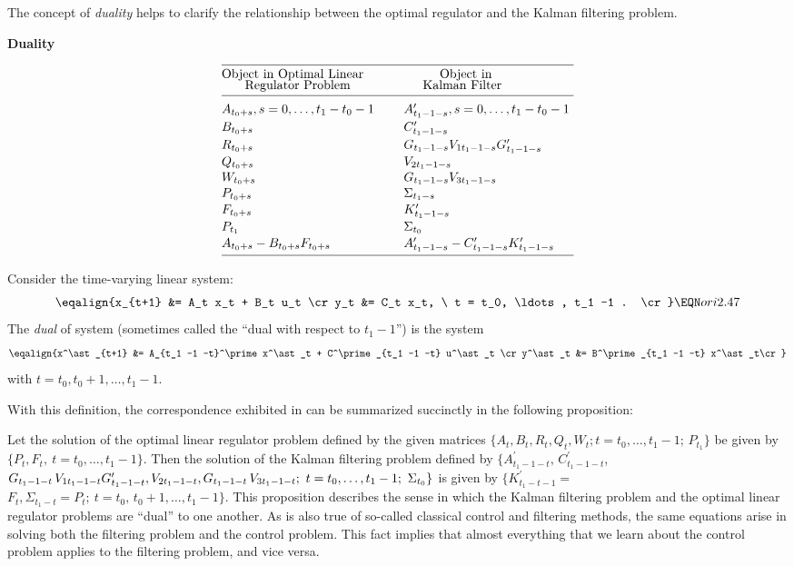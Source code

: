 The concept of {\it duality\/} helps to clarify the relationship between
the optimal regulator and the Kalman filtering problem.
\medskip
{}
\caption{\bf Duality}
$$\vbox{\offinterlineskip \hrule
\halign{#\hfil & \qquad #\hfil \cr
\noalign{\smallskip}
Object in Optimal Linear & \phantom{00000} Object in \cr
\phantom{000} Regulator Problem & \phantom{000}Kalman Filter \cr
\noalign{\smallskip}
    \noalign{\hrule}
\noalign{\medskip}
$A_{t_0 + s}, s = 0,\ldots, t_1 - t_0 -1$ & $A_{t_1 - 1 -s}^\prime,
s=0, \ldots, t_1 -t_0 -1$ \cr
\noalign{\smallskip}
$B_{t_0 + s}$ & $C_{t_1 -1 -s}^\prime$ \cr
\noalign{\smallskip}
$R_{t_0+s}$ & $G_{t_1 -1 -s} V_{1 t_1 -1 -s} G_{t_1 -1 -s}^\prime$ \cr
\noalign{\smallskip}
$Q_{t_0 + s}$ & $V_{2t_1 -1 -s}$ \cr
\noalign{\smallskip}
$W_{t_0 + s}$ & $G_{t_1 -1 -s} V_{3 t_1 -1 -s}$\cr
\noalign{\smallskip}
$P_{t_0 + s}$ & $\Sigma_{t_1 - s}$\cr
\noalign{\smallskip}
$F_{t_0 + s}$ & $K_{t_1 -1 -s}^\prime$ \cr
\noalign{\smallskip}
$P_{t_1}$ & $\Sigma_{t_0}$ \cr
\noalign{\smallskip}
$A_{t_0 + s} - B_{t_0 + s} F_{t_0 +s}$ & $A_{t_1 -1 -s}^\prime -
C_{t_1 -1 -s}^\prime K_{t_1 -1 -s}^\prime$ \cr
\noalign{\smallskip}\cr
\noalign{\hrule}  }}$$
\endtable
 Consider the time-varying linear system:
$$\eqalign{x_{t+1} &= A_t x_t + B_t u_t \cr
y_t &= C_t x_t, \  t = t_0, \ldots, t_1 -1 . \cr} \EQN ori2.47$$
The {\it dual\/} of system  (sometimes called the ``dual
with respect to $t_1-1$'') is the system
$$\eqalign{x^\ast_{t+1} &= A_{t_1 -1 -t}^\prime x^\ast_t +
C^\prime_{t_1 -1 -t} u^\ast_t \cr
y^\ast_t &= B^\prime_{t_1 -1 -t} x^\ast_t\cr}$$
with $t = t_0, t_0 + 1, \ldots, t_1 -1$.
\enddefinition

With this definition, the correspondence exhibited in  %
 can be
summarized succinctly in the following proposition:

 Let the solution of the optimal linear regulator
problem defined by the given matrices
 $\{A_t, B_t, R_t, Q_t, W_t; t = t_0,
\ldots, t_1 -1; \, P_{t_1}\}$ be given by $\{ P_t, F_t, \ t= t_0, \ldots, t_1
-1\}$.  Then the solution of the Kalman filtering problem defined by
$\{A_{t_1 -1 -t}^\prime,\, C_{t_1 -1 -t}^\prime$, $  G_{t_1 -1 -t}\,
V_{1 t_1 -1 -t} G^\prime_{t_1 -1-t},   V_{2 t_1 -1 -t},
G_{t_1 -1 -t}\,\hfil\break V_{3t_1 -1 -t};\ t = t_0, \ldots,
 t_1 -1; \ \Sigma_{t_0}\}$
is given by $\{K_{t_1 -t -1}^\prime =$ $F_t,
\Sigma_{t_1 -t} = P_t; \ t = t_0,\, t_0 + 1, \ldots, t_1 -1 \}$.
\endtheorem
\smallskip
This proposition describes the sense in which the Kalman filtering problem and
the optimal linear regulator problems are ``dual'' to one another.
As is also true of so-called
classical control and filtering methods, the
same equations arise in solving both
the filtering problem and the
control problem.  This fact implies that almost everything that we learn about
the control problem applies to the filtering problem, and {\rm vice versa}.

